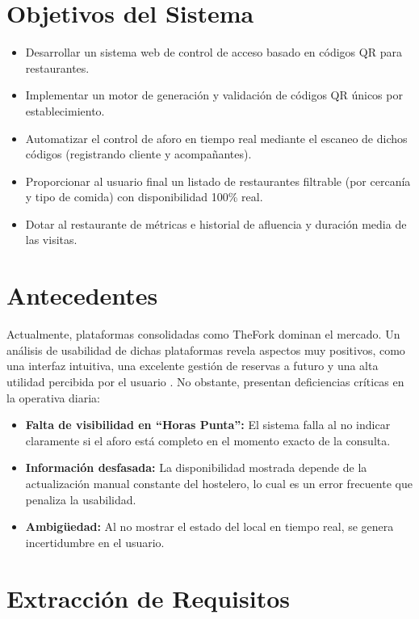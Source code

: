 \section{Objetivos del Sistema}
\begin{itemize}
    \item Desarrollar un sistema web de control de acceso basado en códigos QR para restaurantes.
    \item Implementar un motor de generación y validación de códigos QR únicos por establecimiento.
    \item Automatizar el control de aforo en tiempo real mediante el escaneo de dichos códigos (registrando cliente y acompañantes).
    \item Proporcionar al usuario final un listado de restaurantes filtrable (por cercanía y tipo de comida) con disponibilidad 100\% real.
    \item Dotar al restaurante de métricas e historial de afluencia y duración media de las visitas.
\end{itemize}

\section{Antecedentes}
Actualmente, plataformas consolidadas como TheFork dominan el mercado. Un análisis de usabilidad de dichas plataformas revela aspectos muy positivos, como una interfaz intuitiva, una excelente gestión de reservas a futuro y una alta utilidad percibida por el usuario \cite{TheFork2023}. No obstante, presentan deficiencias críticas en la operativa diaria:

\begin{itemize}
    \item \textbf{Falta de visibilidad en ``Horas Punta'':} El sistema falla al no indicar claramente si el aforo está completo en el momento exacto de la consulta.
    \item \textbf{Información desfasada:} La disponibilidad mostrada depende de la actualización manual constante del hostelero, lo cual es un error frecuente que penaliza la usabilidad.
    \item \textbf{Ambigüedad:} Al no mostrar el estado del local en tiempo real, se genera incertidumbre en el usuario.
\end{itemize}

\section{Extracción de Requisitos}

